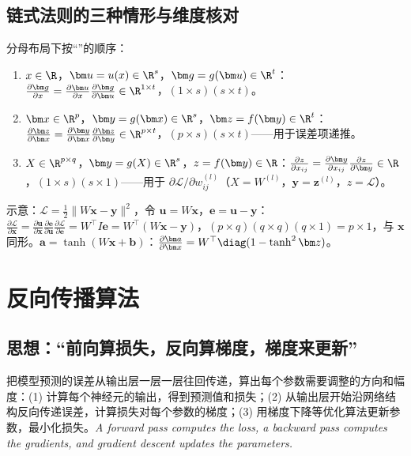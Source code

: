 \subsection{链式法则的三种情形与维度核对}
分母布局下按“”的顺序：
\begin{enumerate}
\item $x\in\R$，$\bm u=u(x)\in\R^s$，$\bm g=g(\bm u)\in\R^t$：$\frac{\partial\bm g}{\partial x}=\frac{\partial\bm u}{\partial x}\frac{\partial\bm g}{\partial\bm u}\in\R^{1\times t}$，$(1\times s)(s\times t)$。
\item $\bm x\in\R^p$，$\bm y=g(\bm x)\in\R^s$，$\bm z=f(\bm y)\in\R^t$：$\frac{\partial\bm z}{\partial\bm x}=\frac{\partial\bm y}{\partial\bm x}\frac{\partial\bm z}{\partial\bm y}\in\R^{p\times t}$，$(p\times s)(s\times t)$——用于误差项递推。
\item $X\in\R^{p\times q}$，$\bm y=g(X)\in\R^s$，$z=f(\bm y)\in\R$：$\frac{\partial z}{\partial x_{ij}}=\frac{\partial\bm y}{\partial x_{ij}}\frac{\partial z}{\partial\bm y}\in\R$，$(1\times s)(s\times1)$——用于 $\partial\mathcal L/\partial w^{(l)}_{ij}$（$X=W^{(l)}$，$\bm y=\bm z^{(l)}$，$z=\mathcal L$）。
\end{enumerate}
示意：$\mathcal L=\frac12\|W\bm x-\bm y\|^2$，令 $\bm u=W\bm x$，$\bm e=\bm u-\bm y$：$\frac{\partial\mathcal L}{\partial\bm x}=\frac{\partial\bm u}{\partial\bm x}\frac{\partial\bm e}{\partial\bm u}\frac{\partial\mathcal L}{\partial\bm e}=W^\top I\bm e=W^\top(W\bm x-\bm y)$，$(p\times q)(q\times q)(q\times1)=p\times1$，与 $\bm x$ 同形。$\bm a=\tanh(W\bm x+\bm b)$：$\frac{\partial\bm a}{\partial\bm x}=W^\top\diag(1-\tanh^2\bm z)$。

\section{反向传播算法}

\subsection{思想：“前向算损失，反向算梯度，梯度来更新”}
把模型预测的误差从输出层一层一层往回传递，算出每个参数需要调整的方向和幅度：(1) 计算每个神经元的输出，得到预测值和损失；(2) 从输出层开始沿网络结构反向传递误差，计算损失对每个参数的梯度；(3) 用梯度下降等优化算法更新参数，最小化损失。\textit{A forward pass computes the loss, a backward pass computes the gradients, and gradient descent updates the parameters.}

